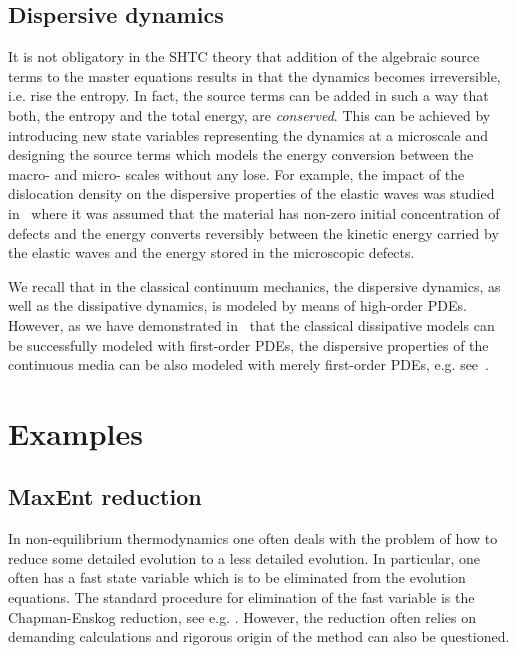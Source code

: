 \documentclass[twoside]{article}
\begin{document}
\subsection{Dispersive dynamics}

It is not obligatory in the SHTC theory that addition of the algebraic source 
terms to the master equations results in that the dynamics becomes 
irreversible, i.e. rise the entropy. In fact, the source terms can be added in 
such a way that both, the entropy and the total energy, are \textit{conserved}. 
This can be achieved by introducing new state variables representing the 
dynamics at a microscale and designing the source terms which models the energy 
conversion between the macro- and micro- scales without any lose. For example, 
the impact of the dislocation density on the dispersive properties of the 
elastic waves was studied in~\cite{Romenski2011} where it was assumed that the 
material has non-zero initial concentration of defects and the energy  converts 
reversibly between the kinetic energy carried by the elastic waves and the 
energy stored in the microscopic defects. 

We recall that in the classical continuum mechanics, the dispersive dynamics, 
as well as the dissipative dynamics, is modeled by means of high-order PDEs. 
However, as we have demonstrated in~\cite{HPR2016,DPRZ2016,DPRZ2017} that the 
classical dissipative models can be successfully modeled with first-order PDEs, 
the dispersive properties of the continuous media can be also modeled with 
merely first-order PDEs, e.g. see~\cite{Romenski2011,Favrie2017,Mazaheri2016}.



\section{Examples}\label{sec.Examples}

\subsection{MaxEnt reduction}\label{sec.MaxEnt}
In non-equilibrium thermodynamics one often deals with the problem of how to 
reduce some detailed evolution to a less detailed evolution. In particular, one 
often has a fast state variable which is to be eliminated from the evolution 
equations. The standard procedure for elimination of the fast variable is the 
Chapman-Enskog reduction, see e.g. \cite{dGM}. However, the reduction often 
relies on demanding calculations and rigorous origin of the method can also be 
questioned.
\end{document}
